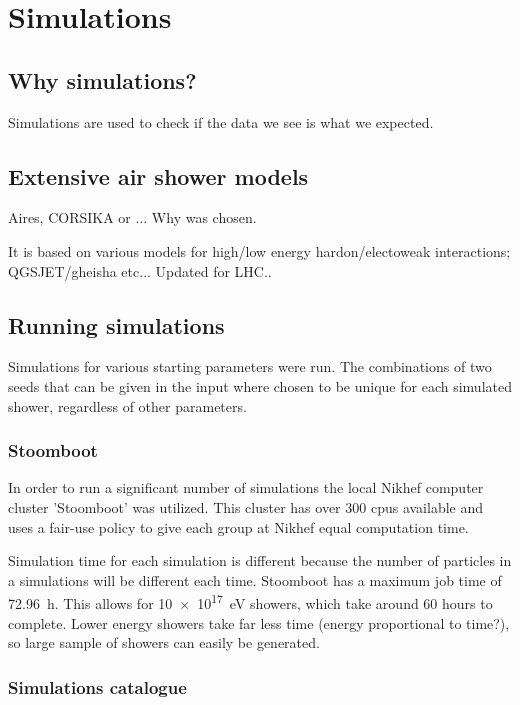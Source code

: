 \chapter{Simulations}
\label{ch:simulations}

\section{Why simulations?}

Simulations are used to check if the data we see is what we expected.



\section{Extensive air shower models}

Aires, CORSIKA or ...
Why was \corsika chosen.

It is based on various models for high/low energy hardon/electoweak
interactions; QGSJET/gheisha etc... Updated for LHC..


\section{Running simulations}

Simulations for various starting parameters were run. The combinations
of two seeds that can be given in the input where chosen to be unique
for each simulated shower, regardless of other parameters.


\subsection{Stoomboot}

In order to run a significant number of simulations the local Nikhef
computer cluster 'Stoomboot' was utilized. This cluster has over 300
cpus available and uses a fair-use policy to give each group at Nikhef
equal computation time. 

Simulation time for each simulation is different because the number of
particles in a simulations will be different each time. Stoomboot has a
maximum job time of \SI{72.96}{\hour}. This allows for
\SI{10e17}{\electronvolt} showers, which take around 60 hours to
complete. Lower energy showers take far less time (energy proportional
to time?), so large sample of showers can easily be generated.


\subsection{Simulations catalogue}

